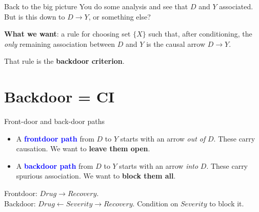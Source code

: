 \documentclass[xcolor=dvipsnames]{beamer}
\newcommand{\la}{\leftarrow}
\begin{document}
\begin{frame}{Back to the big picture}
\small
{} You do some analysis and see that $D$ and $Y$ associated. But is this down to $D \rightarrow Y$, or something else? 

\bigskip
{} \textbf{What we want}: a rule for choosing  set $\{X\}$ such that, after conditioning, the \textit{only} remaining association between $D$ and $Y$ is the causal arrow $D \to Y$.

\bigskip
{} That rule is the \textbf{backdoor criterion}.
\end{frame}


\section{Backdoor = CI}

\begin{frame}{Front-door and back-door paths}
\small
\begin{itemize}
\item<1-> A \textcolor{Blue}{\textbf{frontdoor path}} from $D$ to $Y$ starts with an arrow \textit{out of} $D$.  These carry causation.  We want to \textbf{leave them open}.
\medskip
\item<2-> A \textcolor{Blue}{\textbf{backdoor path}} from $D$ to $Y$ starts with an arrow \textit{into} $D$.  These carry spurious association.  We want to \textbf{block them all}.
\end{itemize}

\bigskip
{}
\begin{center}
\end{center}

\footnotesize
{} Frontdoor: $Drug \to Recovery$.\\
 Backdoor: $Drug \la Severity \to Recovery$.  Condition on $Severity$ to block it.
\end{frame}
\end{document}
